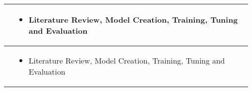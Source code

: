 \begin{longtable}{p{5cm}|p{9.5cm}}
    \nameref{ss:ozxm} &
        \begin{itemize}
            \item \nameref{s:xception} Literature Review, Model Creation, Training, Tuning and Evaluation
        \end{itemize}\\
        \hline
    
    \nameref{ss:ctsh} &
        \begin{itemize}
            \item \nameref{s:densenet121} Literature Review, Model Creation, Training, Tuning and Evaluation
        \end{itemize}\\
    \hline
\end{longtable}
